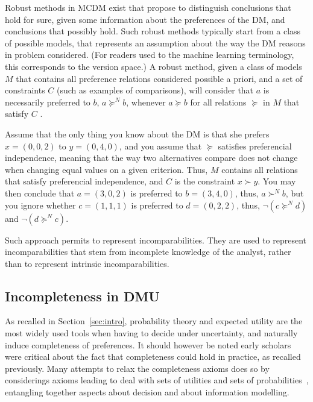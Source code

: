\documentclass[french, english]{llncs}
\begin{document}
	Robust methods in MCDM exist that propose to distinguish conclusions that hold for sure, given some information about the preferences of the DM, and conclusions that possibly hold. Such robust methods typically start from a class of possible models, that represents an assumption about the way the \ac{DM} reasons in problem considered. (For readers used to the machine learning terminology, this corresponds to the version space.) A robust method, given a class of models $M$ that contains all preference relations considered possible a priori, and a set of constraints $C$ (such as examples of comparisons), will consider that $a$ is necessarily preferred to $b$, $a \succeq^N b$, whenever $a \succeq b$ for all relations $\succeq$ in $M$ that satisfy $C$ \citep{greco_ordinal_2008}.
	\begin{example} Assume that the only thing you know about the \ac{DM} is that she prefers $x = (0, 0, 2)$ to $y = (0, 4, 0)$, and you assume that $\succeq$ satisfies preferencial independence, meaning that the way two alternatives compare does not change when changing equal values on a given criterion. Thus, $M$ contains all relations that satisfy preferencial independence, and $C$ is the constraint $x \succ y$. You may then conclude that $a = (3, 0, 2)$ is preferred to $b = (3, 4, 0)$, thus, $a \succ^N b$, but you ignore whether $c = (1, 1, 1)$ is preferred to $d = (0, 2, 2)$, thus, $¬(c \succeq^N d)$ and $¬(d \succeq^N c)$.
	\end{example} 
	Such approach permits to represent incomparabilities. They are used to represent incomparabilities that stem from incomplete knowledge of the analyst, rather than to represent intrinsic incomparabilities.
	
	\subsection{Incompleteness in DMU}
	
	As recalled in Section~\ref{sec:intro}, probability theory and expected utility are the most widely used tools when having to decide under uncertainty, and naturally induce completeness of preferences. It should however be noted early scholars were critical about the fact that completeness could hold in practice, as recalled previously. Many attempts to relax the completeness axioms does so by considerings axioms leading to deal with sets of utilities and sets of probabilities~\cite{aumann_utility_1962}, entangling together aspects about decision and about information modelling. 
	
\end{document}
